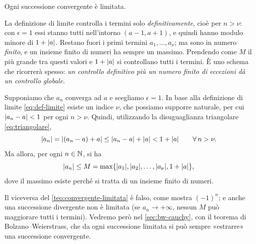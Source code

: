 \begin{teorema}\label{teo:convergente-limitata}
Ogni successione convergente è limitata.
\end{teorema}

\begin{schema}
\end{schema}

\begin{strategia}
La definizione di limite controlla i termini solo \emph{definitivamente}, cioè per
$n>\nu$: con $\epsilon=1$ essi stanno tutti nell'intorno $(a-1,a+1)$, e quindi hanno
modulo minore di $1+\lvert a\rvert$. Restano fuori i primi termini $a_{1},\dots,a_{\nu}$; ma sono
in numero \emph{finito}, e un insieme finito di numeri ha sempre un massimo. Prendendo
come $M$ il più grande tra questi valori e $1+\lvert a\rvert$ si controllano tutti i termini.
È uno schema che ricorrerà spesso: \emph{un controllo definitivo più un numero finito di
eccezioni dà un controllo globale}.
\end{strategia}

\begin{dimostrazione}
Supponiamo che $a_{n}$ converga ad $a$ e scegliamo $\epsilon=1$. In base alla definizione
di limite \eqref{eq:def-limite} esiste un indice $\nu$, che possiamo supporre naturale,
per cui $\lvert a_{n}-a\rvert<1$ per ogni $n>\nu$. Quindi, utilizzando la disuguaglianza
triangolare \eqref{eq:triangolare},
\begin{equation}\label{eq:conv-lim-passo}
  \lvert a_{n}\rvert=\lvert (a_{n}-a)+a\rvert\le\lvert a_{n}-a\rvert+\lvert a\rvert<1+\lvert a\rvert \qquad\forall\, n>\nu .
\end{equation}
Ma allora, per ogni $n\in\mathbb{N}$, si ha
\begin{equation}\label{eq:conv-lim-M}
  \lvert a_{n}\rvert\le M=\max\{\lvert a_{1}\rvert,\lvert a_{2}\rvert,\dots,\lvert a_{\nu}\rvert,1+\lvert a\rvert\},
\end{equation}
dove il massimo esiste perché si tratta di un insieme finito di numeri.
\end{dimostrazione}

\begin{osservazione}
Il viceversa del \cref{teo:convergente-limitata} è falso, come mostra $(-1)^{n}$; e
anche una successione divergente non è limitata (se $a_{n}\to+\infty$, nessun $M$ può
maggiorare tutti i termini). Vedremo però nel \cref{sec:bw-cauchy}, con il teorema di
Bolzano--Weierstrass, che da ogni successione limitata si può sempre «estrarre» una
successione convergente.
\end{osservazione}

